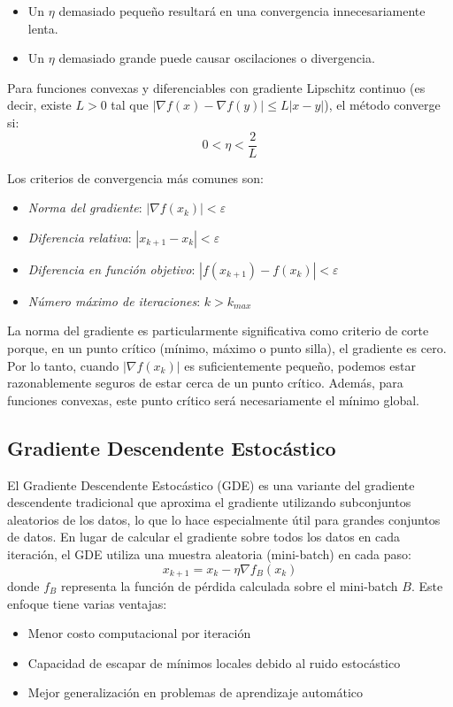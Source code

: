\documentclass{tp02}
\begin{document}
\begin{itemize}
    \item Un $\eta$ demasiado pequeño resultará en una convergencia innecesariamente lenta.
    \item Un $\eta$ demasiado grande puede causar oscilaciones o divergencia.
\end{itemize}

Para funciones convexas y diferenciables con gradiente Lipschitz continuo (es decir,
existe $L>0$ tal que $|\nabla f(x) - \nabla f(y)| \leq L|x-y|$), el método
converge si:
\begin{equation}
0 < \eta < \frac{2}{L}
\end{equation}

Los criterios de convergencia más comunes son:
\begin{itemize}
\item \textit{Norma del gradiente}: $|\nabla f(x_k)| < \varepsilon$
\item \textit{Diferencia relativa}: $|x_{k+1} - x_k| < \varepsilon$
\item \textit{Diferencia en función objetivo}: $|f(x_{k+1}) - f(x_k)| < \varepsilon$
\item \textit{Número máximo de iteraciones}: $k > k_{max}$
\end{itemize}

La norma del gradiente es particularmente significativa como criterio de corte porque,
en un punto crítico (mínimo, máximo o punto silla), el gradiente es cero. Por lo tanto,
cuando $|\nabla f(x_k)|$ es suficientemente pequeño, podemos estar razonablemente
seguros de estar cerca de un punto crítico. Además, para funciones convexas, este punto
crítico será necesariamente el mínimo global.

\subsection{Gradiente Descendente Estocástico}
El Gradiente Descendente Estocástico (GDE) es una variante del gradiente descendente
tradicional que aproxima el gradiente utilizando subconjuntos aleatorios de los datos,
lo que lo hace especialmente útil para grandes conjuntos de datos. En lugar de calcular
el gradiente sobre todos los datos en cada iteración, el GDE utiliza una muestra
aleatoria (mini-batch) en cada paso:
\begin{equation}
x_{k+1} = x_k - \eta \nabla f_B(x_k)
\end{equation}
donde $f_B$ representa la función de pérdida calculada sobre el mini-batch $B$. Este
enfoque tiene varias ventajas:
\begin{itemize}
\item Menor costo computacional por iteración
\item Capacidad de escapar de mínimos locales debido al ruido estocástico
\item Mejor generalización en problemas de aprendizaje automático
\end{itemize}
\end{document}
